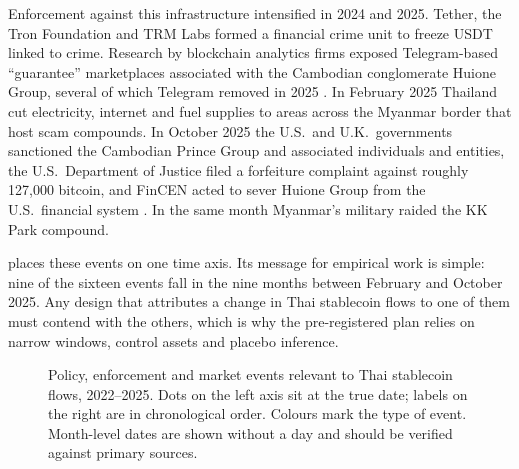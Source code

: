 Enforcement against this infrastructure intensified in 2024 and 2025. Tether, the Tron Foundation and TRM Labs formed a
financial crime unit to freeze USDT linked to crime. Research by blockchain analytics firms exposed Telegram-based
``guarantee'' marketplaces associated with the Cambodian conglomerate Huione Group, several of which Telegram removed in
2025 \citep{elliptic2024huione}. In February 2025 Thailand cut electricity, internet and fuel supplies to areas across
the Myanmar border that host scam compounds. In October 2025 the U.S.\ and U.K.\ governments sanctioned the Cambodian
Prince Group and associated individuals and entities, the U.S.\ Department of Justice filed a forfeiture complaint
against roughly 127,000 bitcoin, and FinCEN acted to sever Huione Group from the U.S.\ financial system
\citep{ustreasury2025prince,fincen2025huione}. In the same month Myanmar's military raided the KK Park compound.

 places these events on one time axis. Its message for empirical work is simple: nine of the
sixteen events fall in the nine months between February and October 2025. Any design that attributes a change in
Thai stablecoin flows to one of them must contend with the others, which is why the pre-registered plan relies on
narrow windows, control assets and placebo inference.

\begin{figure}[!htbp]
\centering
{}
\caption{Policy, enforcement and market events relevant to Thai stablecoin flows, 2022--2025. Dots on the left axis
sit at the true date; labels on the right are in chronological order. Colours mark the type of event. Month-level
dates are shown without a day and should be verified against primary sources.}
\label{fig:timeline}
\end{figure}
